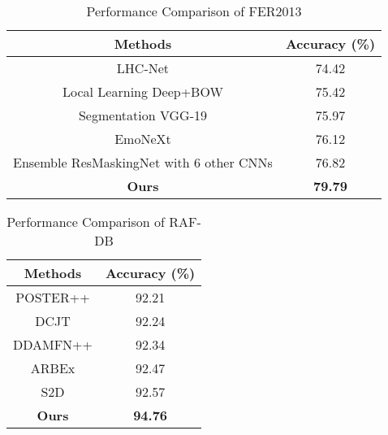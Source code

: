 \begin{table}[h]
    \small
    \caption{Performance Comparison of FER2013}
    \begin{tabular}{|c|c|}
        \hline
         \textbf{Methods} & \textbf{Accuracy (\%)} \\
         \hline

         LHC-Net \cite{multiheadchannel} & 74.42 \\
         \hline
         Local Learning Deep+BOW \cite{georgescu2019local} & 75.42 \\
         \hline
         Segmentation VGG-19 \cite{vignesh2023novel} & 75.97 \\
         \hline
         EmoNeXt \cite{el2023emonext} & 76.12 \\
         \hline
         Ensemble ResMaskingNet with 6 other CNNs \cite{residualmasking} & 76.82 \\
         \hline
         \textbf{Ours} & \textbf{79.79} \\
         \hline
    \end{tabular}
\end{table}

\begin{table}[h]
    \centering
    \small
    \caption{Performance Comparison of RAF-DB}
    \setlength{\tabcolsep}{20pt}
    \begin{tabular}{|c|c|}
        \hline
         \textbf{Methods} & \textbf{Accuracy (\%)} \\
         \hline

         POSTER++ \cite{poster++} & 92.21 \\
         \hline
         DCJT \cite{dcjt} & 92.24 \\
         \hline
         DDAMFN++ \cite{zhang2023dual} & 92.34 \\
         \hline
         ARBEx \cite{arbex} & 92.47 \\
         \hline
         S2D \cite{s2d} & 92.57 \\
         \hline
         \textbf{Ours} & \textbf{94.76} \\
         \hline
    \end{tabular}
\end{table}

